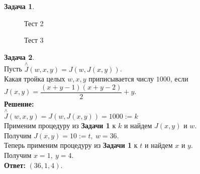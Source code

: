 \documentclass[a4paper,12pt]{article}
\theoremstyle{definition} %
\theoremstyle{definition} %
\newtheorem{problem}{Задача}[section]
\theoremstyle{remark} %
\begin{document}
\begin{problem}
	 \begin{figure}[h]
	 	\caption{Тест 2}	 	
	 \end{figure}
 
 	\begin{figure}[h]
 		\caption{Тест 3}	 	
 	\end{figure}
\end{problem}

\begin{problem}\ \\[2ex]
	Пусть $\stackrel{\wedge}{J}(w, x, y) = J(w, J(x, y))$. \\[1ex]
	Какая тройка целых $w, x, y$ приписывается числу $1000$, если \\[1ex]
	$J(x, y) = \dfrac{(x + y - 1)(x + y - 2)}{2} + y$. \\[3ex]
	
	\textbf{Решение:} \\[2ex]
	$\stackrel{\wedge}{J}(w, x, y) = J(w, J(x, y)) = 1000 := k$ \\[1ex] 
	Применим процедуру из \textbf{Задачи 1} к $k$ и найдем $J(x, y)$ и $w$. \\[1ex]
	Получим $J(x, y) = 10 := t, \ w = 36$. \\[1ex]
	Теперь применим процедуру из \textbf{Задачи 1} к $t$ и найдем $x$ и $y$. \\[1ex]
	Получим $x = 1, \ y = 4$. \\[2ex]
	
	\textbf{Ответ:} $(36, 1, 4).$ \\[4ex]
\end{problem}
\end{document}
